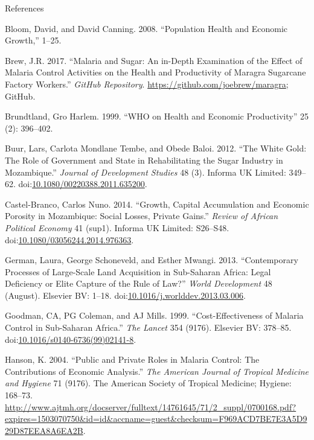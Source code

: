 \documentclass[ignorenonframetext,]{beamer}
\begin{document}
\begin{frame}[allowframebreaks]{References}

\hypertarget{refs}{}
\hypertarget{ref-Bloom2008}{}
Bloom, David, and David Canning. 2008. ``Population Health and Economic
Growth,'' 1--25.

\hypertarget{ref-brewgit}{}
Brew, J.R. 2017. ``Malaria and Sugar: An in-Depth Examination of the
Effect of Malaria Control Activities on the Health and Productivity of
Maragra Sugarcane Factory Workers.'' \emph{GitHub Repository}.
\url{https://github.com/joebrew/maragra}; GitHub.

\hypertarget{ref-World1999}{}
Brundtland, Gro Harlem. 1999. ``WHO on Health and Economic
Productivity'' 25 (2): 396--402.

\hypertarget{ref-Buur2012}{}
Buur, Lars, Carlota Mondlane Tembe, and Obede Baloi. 2012. ``The White
Gold: The Role of Government and State in Rehabilitating the Sugar
Industry in Mozambique.'' \emph{Journal of Development Studies} 48 (3).
Informa UK Limited: 349--62.
doi:\href{https://doi.org/10.1080/00220388.2011.635200}{10.1080/00220388.2011.635200}.

\hypertarget{ref-CastelBranco2014}{}
Castel-Branco, Carlos Nuno. 2014. ``Growth, Capital Accumulation and
Economic Porosity in Mozambique: Social Losses, Private Gains.''
\emph{Review of African Political Economy} 41 (sup1). Informa UK
Limited: S26--S48.
doi:\href{https://doi.org/10.1080/03056244.2014.976363}{10.1080/03056244.2014.976363}.

\hypertarget{ref-German2013}{}
German, Laura, George Schoneveld, and Esther Mwangi. 2013.
``Contemporary Processes of Large-Scale Land Acquisition in Sub-Saharan
Africa: Legal Deficiency or Elite Capture of the Rule of Law?''
\emph{World Development} 48 (August). Elsevier BV: 1--18.
doi:\href{https://doi.org/10.1016/j.worlddev.2013.03.006}{10.1016/j.worlddev.2013.03.006}.

\hypertarget{ref-Goodman1999}{}
Goodman, CA, PG Coleman, and AJ Mills. 1999. ``Cost-Effectiveness of
Malaria Control in Sub-Saharan Africa.'' \emph{The Lancet} 354 (9176).
Elsevier BV: 378--85.
doi:\href{https://doi.org/10.1016/s0140-6736(99)02141-8}{10.1016/s0140-6736(99)02141-8}.

\hypertarget{ref-Hanson2004}{}
Hanson, K. 2004. ``Public and Private Roles in Malaria Control: The
Contributions of Economic Analysis.'' \emph{The American Journal of
Tropical Medicine and Hygiene} 71 (9176). The American Society of
Tropical Medicine; Hygiene: 168--73.
\url{http://www.ajtmh.org/docserver/fulltext/14761645/71/2_suppl/0700168.pdf?expires=1503070750\&id=id\&accname=guest\&checksum=F969ACD7BE7E3A5D929D87EEA8A6EA2B}.


\end{frame}
\end{document}
